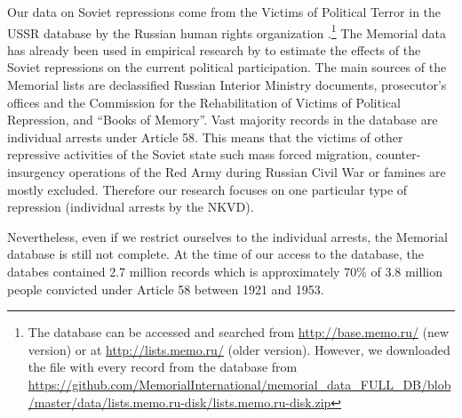 Our data on Soviet repressions come from  the Victims of Political Terror in the USSR database by the Russian human rights organization \citet{memorial_zhertvy_2017}.\footnote{The database can be accessed and searched from  \url{http://base.memo.ru/} (new version) or at \url{http://lists.memo.ru/} (older version). However, we downloaded the file with every record from the database from \url{https://github.com/MemorialInternational/memorial_data_FULL_DB/blob/master/data/lists.memo.ru-disk/lists.memo.ru-disk.zip}} 
The Memorial data has already been used in empirical research by \citet{zhukov_stalins_2018} to estimate the  effects of the Soviet repressions on the current political participation. 
 The main sources of the Memorial lists are declassified Russian Interior Ministry documents, prosecutor’s offices and the Commission for the Rehabilitation of Victims of Political Repression, and \enquote{Books of Memory}. 
Vast  majority records in the database are individual arrests under  Article 58. 
This means that the victims of other repressive activities of the Soviet state such mass forced migration, counter-insurgency operations of the Red Army during Russian Civil War or famines are mostly excluded. Therefore our research focuses on one  particular type of repression (individual arrests by the NKVD). 

Nevertheless, even if we restrict ourselves to the individual arrests, the Memorial database is still not complete.
At the time of our access to the database, the databes contained 2.7 million records which is approximately 70\% of 3.8 million people convicted under Article 58 between 1921 and 1953.



